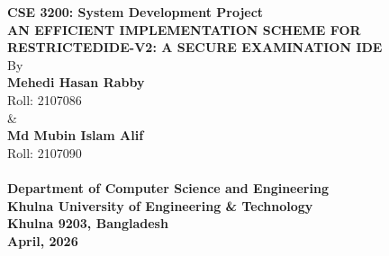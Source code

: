 \documentclass[12pt,a4paper]{report}
\begin{document}
	
	\begin{titlepage}
		\thispagestyle{empty}
		\begin{center}
			{\large \textbf{CSE 3200: System Development Project}}\\[1.5\baselineskip]
			{\LARGE \textbf{AN EFFICIENT IMPLEMENTATION SCHEME FOR}}\\[0.7\baselineskip]
			{\LARGE \textbf{RESTRICTEDIDE-V2: A SECURE EXAMINATION IDE}}\\[2\baselineskip]
			
			{\large By}\\[2\baselineskip]
			
			{\large \textbf{Mehedi Hasan Rabby}}\\
			{\large Roll: 2107086}\\[0.5\baselineskip]
			{\large \&}\\[0.5\baselineskip]
			{\large \textbf{Md Mubin Islam Alif}}\\
			{\large Roll: 2107090}\\[3\baselineskip]
			
			\\[2\baselineskip]
			
			{\large \textbf{Department of Computer Science and Engineering}}\\
			{\large \textbf{Khulna University of Engineering \& Technology}}\\
			{\large \textbf{Khulna 9203, Bangladesh}}\\
			{\large \textbf{April, 2026}}
		\end{center}
	\end{titlepage}
	
\end{document}
